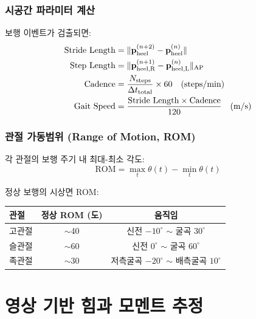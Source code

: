 \documentclass[11pt, a4paper]{report}
\begin{document}
\subsection{시공간 파라미터 계산}

보행 이벤트가 검출되면:
\begin{align}
\text{Stride Length} &= \| \mathbf{p}_{\text{heel}}^{(n+2)} - \mathbf{p}_{\text{heel}}^{(n)} \| \\
\text{Step Length} &= \| \mathbf{p}_{\text{heel,R}}^{(n+1)} - \mathbf{p}_{\text{heel,L}}^{(n)} \|_{\text{AP}} \\
\text{Cadence} &= \frac{N_{\text{steps}}}{\Delta t_{\text{total}}} \times 60 \quad \text{(steps/min)} \\
\text{Gait Speed} &= \frac{\text{Stride Length} \times \text{Cadence}}{120} \quad \text{(m/s)}
\end{align}

\subsection{관절 가동범위 (Range of Motion, ROM)}

각 관절의 보행 주기 내 최대-최소 각도:
\begin{equation}
\text{ROM} = \max_t \theta(t) - \min_t \theta(t)
\end{equation}

정상 보행의 시상면 ROM:

\begin{center}
\renewcommand{\arraystretch}{1.3}
\begin{tabular}{lcc}
\toprule
\textbf{관절} & \textbf{정상 ROM (도)} & \textbf{움직임} \\
\midrule
고관절 & $\sim$40 & 신전 $-10^\circ$ $\sim$ 굴곡 $30^\circ$ \\
슬관절 & $\sim$60 & 신전 $0^\circ$ $\sim$ 굴곡 $60^\circ$ \\
족관절 & $\sim$30 & 저측굴곡 $-20^\circ$ $\sim$ 배측굴곡 $10^\circ$ \\
\bottomrule
\end{tabular}
\end{center}


\chapter{영상 기반 힘과 모멘트 추정}
\label{ch:force_estimation}
\end{document}
